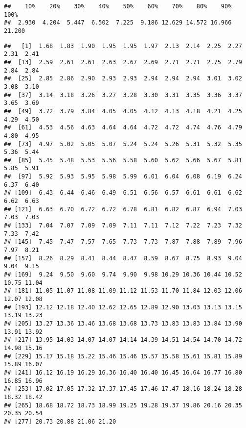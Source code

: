 \documentclass[
]{article}
\newenvironment{Shaded}{\begin{snugshade}}{\end{snugshade}}
\newcommand{\AttributeTok}[1]{\textcolor[rgb]{0.13,0.29,0.53}{#1}}
\newcommand{\DecValTok}[1]{\textcolor[rgb]{0.00,0.00,0.81}{#1}}
\newcommand{\FunctionTok}[1]{\textcolor[rgb]{0.13,0.29,0.53}{\textbf{#1}}}
\newcommand{\NormalTok}[1]{#1}
\newcommand{\SpecialCharTok}[1]{\textcolor[rgb]{0.81,0.36,0.00}{\textbf{#1}}}
\begin{document}
\begin{Shaded}
\end{Shaded}

\begin{verbatim}
##    10%    20%    30%    40%    50%    60%    70%    80%    90%   100% 
##  2.930  4.204  5.447  6.502  7.225  9.186 12.629 14.572 16.966 21.200
\end{verbatim}

\begin{Shaded}
\end{Shaded}

\begin{verbatim}
##   [1]  1.68  1.83  1.90  1.95  1.95  1.97  2.13  2.14  2.25  2.27  2.31  2.41
##  [13]  2.59  2.61  2.61  2.63  2.67  2.69  2.71  2.71  2.75  2.79  2.84  2.84
##  [25]  2.85  2.86  2.90  2.93  2.93  2.94  2.94  2.94  3.01  3.02  3.08  3.10
##  [37]  3.14  3.18  3.26  3.27  3.28  3.30  3.31  3.35  3.36  3.37  3.65  3.69
##  [49]  3.72  3.79  3.84  4.05  4.05  4.12  4.13  4.18  4.21  4.25  4.29  4.50
##  [61]  4.53  4.56  4.63  4.64  4.64  4.72  4.72  4.74  4.76  4.79  4.80  4.95
##  [73]  4.97  5.02  5.05  5.07  5.24  5.24  5.26  5.31  5.32  5.35  5.36  5.44
##  [85]  5.45  5.48  5.53  5.56  5.58  5.60  5.62  5.66  5.67  5.81  5.85  5.91
##  [97]  5.92  5.93  5.95  5.98  5.99  6.01  6.04  6.08  6.19  6.24  6.37  6.40
## [109]  6.43  6.44  6.46  6.49  6.51  6.56  6.57  6.61  6.61  6.62  6.62  6.63
## [121]  6.63  6.70  6.72  6.72  6.78  6.81  6.82  6.87  6.94  7.03  7.03  7.03
## [133]  7.04  7.07  7.09  7.09  7.11  7.11  7.12  7.22  7.23  7.32  7.33  7.42
## [145]  7.45  7.47  7.57  7.65  7.73  7.73  7.87  7.88  7.89  7.96  7.97  8.21
## [157]  8.26  8.29  8.41  8.44  8.47  8.59  8.67  8.75  8.93  9.04  9.04  9.15
## [169]  9.24  9.50  9.60  9.74  9.90  9.98 10.29 10.36 10.44 10.52 10.75 11.04
## [181] 11.05 11.07 11.08 11.09 11.12 11.53 11.70 11.84 12.03 12.06 12.07 12.08
## [193] 12.12 12.18 12.40 12.62 12.65 12.89 12.90 13.03 13.13 13.15 13.19 13.23
## [205] 13.27 13.36 13.46 13.68 13.68 13.73 13.83 13.83 13.84 13.90 13.91 13.92
## [217] 13.95 14.03 14.07 14.07 14.14 14.39 14.51 14.54 14.70 14.72 14.98 15.16
## [229] 15.17 15.18 15.22 15.46 15.46 15.57 15.58 15.61 15.81 15.89 15.89 16.07
## [241] 16.12 16.19 16.29 16.36 16.40 16.40 16.45 16.64 16.77 16.80 16.85 16.96
## [253] 17.02 17.05 17.32 17.37 17.45 17.46 17.47 18.16 18.24 18.28 18.32 18.42
## [265] 18.68 18.72 18.73 18.99 19.25 19.28 19.37 19.86 20.16 20.35 20.35 20.54
## [277] 20.73 20.88 21.06 21.20
\end{verbatim}
\end{document}
